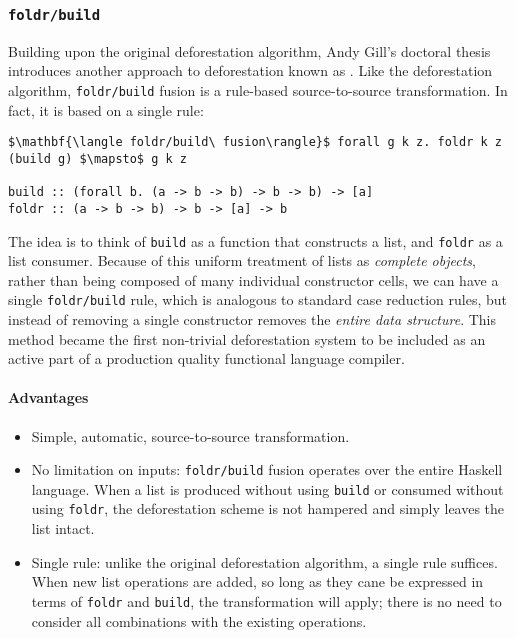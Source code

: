 \subsubsection{\texttt{foldr/build}}

Building upon the original deforestation algorithm, Andy
Gill's doctoral thesis introduces another approach to deforestation known as
 \cite{Gill:1996tf,Gill:1993}.
Like the deforestation algorithm, \texttt{foldr/build} fusion is a rule-based
source-to-source transformation. In fact, it is based on a single rule:
%
\begin{lstlisting}[style=Haskell,numbers=none,mathescape=true, caption={The \texttt{foldr/build} transformation}]
$\mathbf{\langle foldr/build\ fusion\rangle}$ forall g k z. foldr k z (build g) $\mapsto$ g k z

build :: (forall b. (a -> b -> b) -> b -> b) -> [a]
foldr :: (a -> b -> b) -> b -> [a] -> b
\end{lstlisting}

The idea is to think of \texttt{build} as a function that constructs a list, and
\texttt{foldr} as a list consumer. Because of this uniform treatment of lists as
\emph{complete objects}, rather than being composed of many individual
constructor cells, we can have a single \texttt{foldr/build} rule, which is
analogous to standard case reduction rules, but instead of removing a single
constructor removes the \emph{entire data structure}. This method became the
first non-trivial deforestation system to be included as an active part of a
production quality functional language compiler.

\paragraph{Advantages}
\begin{itemize}
    \item Simple, automatic, source-to-source transformation.

    \item No limitation on inputs: \texttt{foldr/build} fusion operates over the
        entire Haskell language. When a list is produced without using
        \texttt{build} or consumed without using \texttt{foldr}, the
        deforestation scheme is not hampered and simply leaves the list intact.

    \item Single rule: unlike the original deforestation algorithm, a single
        rule suffices. When new list operations are added, so long as they cane
        be expressed in terms of \texttt{foldr} and \texttt{build}, the
        transformation will apply; there is no need to consider all combinations
        with the existing operations.
\end{itemize}

